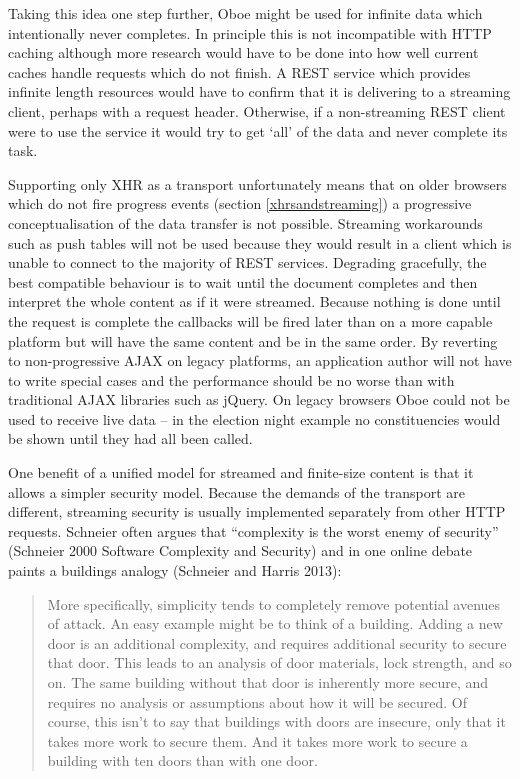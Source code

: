 \documentclass[12pt, ]{article}
\begin{document}
Taking this idea one step further, Oboe might be used for infinite data
which intentionally never completes. In principle this is not
incompatible with HTTP caching although more research would have to be
done into how well current caches handle requests which do not finish. A
REST service which provides infinite length resources would have to
confirm that it is delivering to a streaming client, perhaps with a
request header. Otherwise, if a non-streaming REST client were to use
the service it would try to get `all' of the data and never complete its
task.

Supporting only XHR as a transport unfortunately means that on older
browsers which do not fire progress events (section
\ref{xhrsandstreaming}) a progressive conceptualisation of the data
transfer is not possible. Streaming workarounds such as push tables will
not be used because they would result in a client which is unable to
connect to the majority of REST services. Degrading gracefully, the best
compatible behaviour is to wait until the document completes and then
interpret the whole content as if it were streamed. Because nothing is
done until the request is complete the callbacks will be fired later
than on a more capable platform but will have the same content and be in
the same order. By reverting to non-progressive AJAX on legacy
platforms, an application author will not have to write special cases
and the performance should be no worse than with traditional AJAX
libraries such as jQuery. On legacy browsers Oboe could not be used to
receive live data -- in the election night example no constituencies
would be shown until they had all been called.

One benefit of a unified model for streamed and finite-size content is
that it allows a simpler security model. Because the demands of the
transport are different, streaming security is usually implemented
separately from other HTTP requests. Schneier often argues that
``complexity is the worst enemy of security'' (Schneier 2000 Software
Complexity and Security) and in one online debate paints a buildings
analogy (Schneier and Harris 2013):

\begin{quote}
More specifically, simplicity tends to completely remove potential
avenues of attack. An easy example might be to think of a building.
Adding a new door is an additional complexity, and requires additional
security to secure that door. This leads to an analysis of door
materials, lock strength, and so on. The same building without that door
is inherently more secure, and requires no analysis or assumptions about
how it will be secured. Of course, this isn't to say that buildings with
doors are insecure, only that it takes more work to secure them. And it
takes more work to secure a building with ten doors than with one door.
\end{quote}
\end{document}

